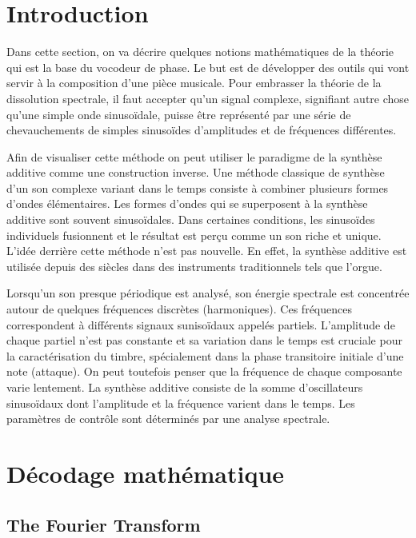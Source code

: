 
\label{ch:Contexte théorique}

\section{Introduction}

Dans cette section, on va décrire quelques notions mathématiques de la théorie qui est la base du vocodeur de phase. Le but est de développer des outils qui vont servir à la composition d'une pièce musicale. Pour embrasser la théorie de la dissolution spectrale, il faut accepter qu'un signal complexe, signifiant autre chose qu'une simple onde sinusoïdale, puisse être représenté par une série de chevauchements de simples sinusoïdes d'amplitudes et de fréquences différentes.

Afin de visualiser cette méthode on peut utiliser le paradigme de la synthèse additive comme une construction inverse. Une méthode classique de synthèse d'un son complexe variant dans le temps consiste à combiner plusieurs formes d'ondes élémentaires. Les formes d'ondes qui se superposent à la synthèse additive sont souvent sinusoïdales. Dans certaines conditions, les sinusoïdes individuels fusionnent et le résultat est perçu comme un son riche et unique. L'idée derrière cette méthode n'est pas nouvelle. En effet, la synthèse additive est utilisée depuis des siècles dans des instruments traditionnels tels que l’orgue.

Lorsqu'un son presque périodique est analysé, son énergie spectrale est concentrée autour de quelques fréquences discrètes (harmoniques). Ces fréquences correspondent à différents signaux sunisoïdaux appelés partiels. L'amplitude de chaque partiel n'est pas constante et sa variation dans le temps est cruciale pour la caractérisation du timbre, spécialement dans la phase transitoire initiale d’une note (attaque). On peut toutefois penser que la fréquence de chaque composante varie lentement. La synthèse additive consiste de la somme d'oscillateurs sinusoïdaux dont l'amplitude et la fréquence varient dans le temps. Les paramètres de contrôle sont déterminés par une analyse spectrale.

\section{Décodage mathématique}

    \subsection{The Fourier Transform}

